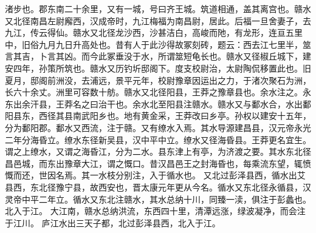\documentclass[12pt,UTF8]{ctexbook}
\begin{document}
渚步也。郡东南二十余里，又有一城，号曰齐王城。筑道相通，盖其离宫也。赣水又北径南昌左尉廨西，汉成帝时，九江梅福为南昌尉，居此。后福一旦舍妻子，去九江，传云得仙。赣水又北径龙沙西，沙甚洁白，高峻而阤，有龙形，连亘五里中，旧俗九月九日升高处也。昔有人于此沙得故冢刻砖，题云：西去江七里半，筮言其吉，卜言其凶。而今此冢垂没于水，所谓筮短龟长也。赣水又径椒丘城下，建安四年，孙策所筑也。赣水又历钓圻邸阁下。度支校尉治，太尉陶侃移置此也。旧夏月，邸阁前洲没，去浦远，景平元年，校尉豫章因运出之力，于渚次聚石为洲，长六十余丈。洲里可容数十舫。赣水又北径阳县，王莽之豫章县也。余水注之。永东出余汗县，王莽名之曰治干也。余水北至阳县注赣水。赣水又与鄱水合，水出鄱阳县东，西径其县南武阳乡也。地有黄金采，王莽改曰乡亭。孙权以建安十五年，分为鄱阳郡。鄱水又西流，注于赣。又有缭水入焉。其水导源建昌县，汉元帝永光二年分海昏立。缭水东径新吴县，汉中平中立。缭水又径海昏县。王莽更名宜生。谓之上缭水，又谓之海昏江，分为二水。县东津上有亭，为济渡之要。其水东北径昌邑城，而东出豫章大江，谓之慨口。昔汉昌邑王之封海昏也，每乘流东望，辄愤慨而还，世因名焉。其一水枝分别注，入于循水也。
又北过彭泽县西，循水出艾县西，东北径豫宁县，故西安也，晋太康元年更从今名。循水又东北径永循县，汉灵帝中平二年立。循水又东北注赣水，其水总纳十川，同臻一渎，俱注于彭蠡也。北入于江。
大江南，赣水总纳洪流，东西四十里，清潭远涨，绿波凝净，而会注于江川。
庐江水出三天子都，北过彭泽县西，北入于江。
\end{document}
